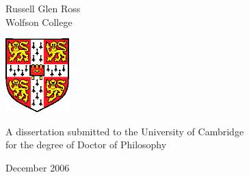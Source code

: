 
\begin{titlepage}
\begin{center}
\vspace*{\fill}

\huge
\thesistitlebig

\vfill
\vfill

\huge
Russell Glen Ross\\[6mm]
\large
Wolfson College

\vfill
\includegraphics[width=70pt]{figures/camshield}
\vfill

\large
A dissertation submitted to the University of Cambridge\\
for the degree of Doctor of Philosophy

\vfill

December 2006

\vspace*{\fill}
\end{center}
\end{titlepage}
